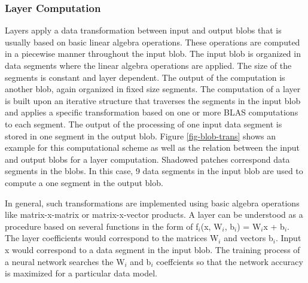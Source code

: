 \subsubsection{Layer Computation}
Layers apply a data transformation between input 
and output blobs that is usually based on basic linear algebra 
operations. These operations are computed in a piecewise manner 
throughout the input blob. The input blob is organized in
data segments where the linear algebra operations are applied. The
size of the segments is constant and layer dependent. The output
of the computation is another blob, again organized in fixed size
segments. The computation of a layer is built upon an iterative
structure that traverses the segments in the input blob and applies
a specific transformation based on one or more BLAS computations 
to each segment. The output of the processing of one input data 
segment is stored in one segment in the output blob. 
Figure \ref{fig-blob-trans} shows an example for this computational 
scheme as well as the relation between the input and output blobs 
for a layer computation. Shadowed patches correspond data segments 
in the blobs. In this case, 9 data segments in the input blob are 
used to compute a one segment in the output blob. 

In general, such transformations are implemented using basic algebra 
operations like matrix-x-matrix or matrix-x-vector products. A layer 
can be understood as a procedure based on several functions in the 
form of f$_i$(x, W$_i$, b$_i$) = W$_i$x + b$_i$. The layer coefficients 
would correspond to the matrices W$_i$ and vectors b$_i$. Input x would 
correspond to a data segment in the input blob. The training process 
of a neural network searches the W$_i$ and b$_i$ coeffcients so that 
the network accuracy is maximized for a particular data model.

